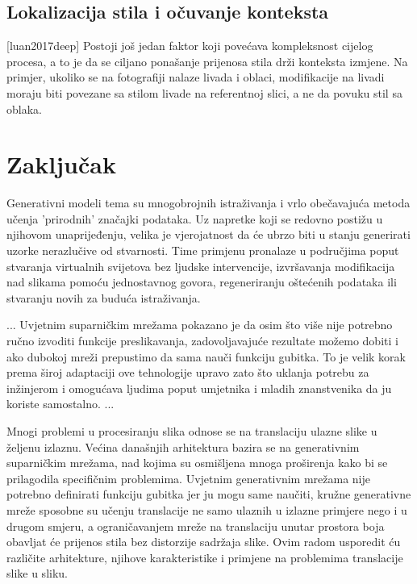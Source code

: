 \documentclass[lmodern, utf8, seminar]{fer}
\begin{document}
\section{Lokalizacija stila i očuvanje konteksta} [luan2017deep]
Postoji još jedan faktor koji povećava kompleksnost cijelog procesa, a to je da se ciljano ponašanje prijenosa stila drži konteksta izmjene. Na primjer, ukoliko se na fotografiji nalaze livada i oblaci, modifikacije na livadi moraju biti povezane sa stilom livade na referentnoj slici, a ne da povuku stil sa oblaka. 



\chapter{Zaključak}
Generativni modeli tema su mnogobrojnih istraživanja i vrlo obečavajuća metoda učenja 'prirodnih' značajki podataka. Uz napretke koji se redovno postižu u njihovom unaprijeđenju, velika je vjerojatnost da će ubrzo biti u stanju generirati uzorke nerazlučive od stvarnosti. Time primjenu pronalaze u područjima poput stvaranja virtualnih svijetova bez ljudske intervencije, izvršavanja modifikacija nad slikama pomoću jednostavnog govora, regeneriranju oštećenih podataka ili stvaranju novih za buduća istraživanja.
\newline

...
Uvjetnim suparničkim mrežama pokazano je da osim što više nije potrebno ručno izvoditi funkcije preslikavanja, zadovoljavajuće rezultate možemo dobiti i ako dubokoj mreži prepustimo da sama nauči funkciju gubitka. To je velik korak prema široj adaptaciji ove tehnologije upravo zato što uklanja potrebu za inžinjerom i omogućava ljudima poput umjetnika i mladih znanstvenika da ju koriste samostalno.
...
\newline







\begin{sazetak}
Mnogi problemi u procesiranju slika odnose se na translaciju ulazne slike u željenu izlaznu. Većina današnjih arhitektura bazira se na generativnim suparničkim mrežama, nad kojima su osmišljena mnoga proširenja kako bi se prilagodila specifičnim problemima. Uvjetnim generativnim mrežama nije potrebno definirati funkciju gubitka jer ju mogu same naučiti, kružne generativne mreže sposobne su učenju translacije ne samo ulaznih u izlazne primjere nego i u drugom smjeru, a ograničavanjem mreže na translaciju unutar prostora boja obavljat će prijenos stila bez distorzije sadržaja slike. Ovim radom usporedit ću različite arhitekture, njihove karakteristike i primjene na problemima translacije slike u sliku.

\end{sazetak}

\begin{abstract}

\end{abstract}
\end{document}
